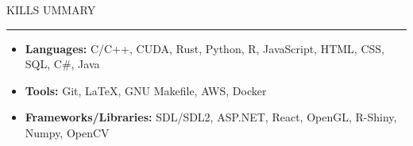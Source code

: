 \documentclass[11pt]{article}
\begin{document}
\par \scalebox{1.3}{S}KILLS \scalebox{1.3}{S}UMMARY                  
\par \vspace{-0.1in} \noindent\rule{7.8in}{0.5pt} 

\begin{itemize}
    \item \textbf{Languages:} \hspace*{3cm} C/C++, CUDA, Rust, Python, R, JavaScript, HTML, CSS, SQL, C\#, Java
    \item \textbf{Tools:} \hspace*{4cm} Git, \LaTeX, GNU Makefile, AWS, Docker
    \item \textbf{Frameworks/Libraries:} \hspace*{0.9cm}SDL/SDL2, ASP.NET, React, OpenGL, R-Shiny, Numpy, OpenCV
\end{itemize}
\end{document}
